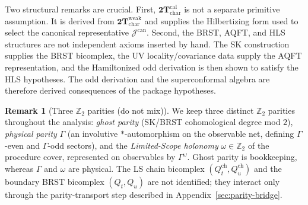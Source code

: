 \documentclass[
  aps,
  prd,
  onecolumn,
  notitlepage,
  nofootinbib,
  superscriptaddress,
  10pt
]{revtex4-2}
\theoremstyle{definition}
\newtheorem{remark}{Remark}[section]
\theoremstyle{plain}
\begin{document}
Two structural remarks are crucial.  First,
\(\mathbf{2T}_{\mathrm{char}}^{\mathrm{cal}}\) is not a separate primitive
assumption.  It is derived from
\(\mathbf{2T}_{\mathrm{char}}^{\mathrm{weak}}\) and supplies the Hilbertizing
form used to select the canonical representative
\(\mathcal J^{\mathrm{can}}\).  Second, the BRST, AQFT, and HLS structures are
not independent axioms inserted by hand.  The SK construction supplies the BRST
bicomplex, the UV locality/covariance data supply the AQFT representation, and
the Hamiltonized odd derivation is then shown to satisfy the HLS hypotheses.
The odd derivation and the superconformal algebra are therefore derived
consequences of the package hypotheses.

\begin{remark}[Three \(\mathbb Z_2\) parities (do not mix)]
\label{rem:three-Z2-main}
We keep three distinct \(\mathbb Z_2\) parities throughout the analysis:
\emph{ghost parity} (SK/BRST cohomological degree mod \(2\)),
\emph{physical parity} \(\Gamma\) (an involutive \( * \)-automorphism on the
observable net, defining \(\Gamma\)-even and \(\Gamma\)-odd sectors), and the
\emph{Limited-Scope holonomy} \(\omega\in\mathbb Z_2\) of the procedure cover,
represented on observables by \(\Gamma^\omega\).  Ghost parity is bookkeeping,
whereas \(\Gamma\) and \(\omega\) are physical.  The LS chain bicomplex
\((Q_t^{\mathrm{ch}},Q_u^{\mathrm{ch}})\) and the boundary BRST bicomplex
\((Q_t,Q_u)\) are not identified; they interact only through the
parity-transport step described in Appendix~\ref{sec:parity-bridge}.
\end{remark}
\end{document}
